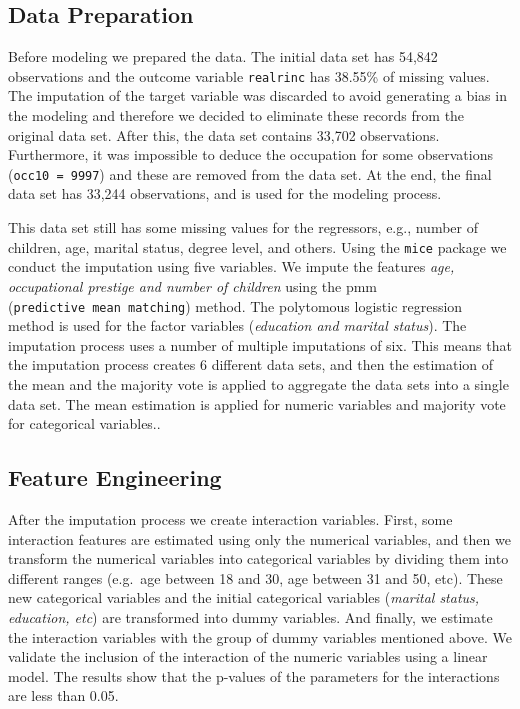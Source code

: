 \documentclass[11pt,a4paper]{article}
\begin{document}
\hypertarget{data-preparation}{%
\subsection{Data Preparation}\label{data-preparation}}

Before modeling we prepared the data. The initial data set has 54,842
observations and the outcome variable \texttt{realrinc} has 38.55\% of
missing values. The imputation of the target variable was discarded to
avoid generating a bias in the modeling and therefore we decided to
eliminate these records from the original data set. After this, the data
set contains 33,702 observations. Furthermore, it was impossible to
deduce the occupation for some observations (\texttt{occ10\ =\ 9997})
and these are removed from the data set. At the end, the final data set
has 33,244 observations, and is used for the modeling process.

This data set still has some missing values for the regressors, e.g.,
number of children, age, marital status, degree level, and others. Using
the \texttt{mice} package we conduct the imputation using five
variables. We impute the features \emph{age, occupational prestige and
number of children} using the pmm (\texttt{predictive\ mean\ matching})
method. The polytomous logistic regression method is used for the factor
variables (\emph{education and marital status}). The imputation process
uses a number of multiple imputations of six. This means that the
imputation process creates 6 different data sets, and then the
estimation of the mean and the majority vote is applied to aggregate the
data sets into a single data set. The mean estimation is applied for
numeric variables and majority vote for categorical variables..

\hypertarget{feature-engineering}{%
\subsection{Feature Engineering}\label{feature-engineering}}

After the imputation process we create interaction variables. First,
some interaction features are estimated using only the numerical
variables, and then we transform the numerical variables into
categorical variables by dividing them into different ranges (e.g.~age
between 18 and 30, age between 31 and 50, etc). These new categorical
variables and the initial categorical variables (\emph{marital status,
education, etc}) are transformed into dummy variables. And finally, we
estimate the interaction variables with the group of dummy variables
mentioned above. We validate the inclusion of the interaction of the
numeric variables using a linear model. The results show that the
p-values of the parameters for the interactions are less than 0.05.
\end{document}
